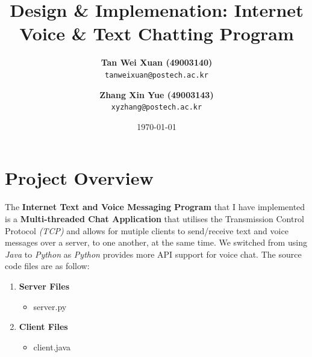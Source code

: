 \documentclass[a4paper,11pt]{article}
\begin{document}
\title{\vspace{-1.0cm}\textbf{Design \& Implemenation: \linebreak Internet Voice \& Text Chatting Program}}
\author{
  \textbf{Tan Wei Xuan (49003140)}\\
  \texttt{tanweixuan@postech.ac.kr}
  \and
   \textbf{Zhang Xin Yue (49003143)}\\
  \texttt{xyzhang@postech.ac.kr}
}
\date{\today}
\maketitle

\section{Project Overview}
The\textbf{ Internet Text and Voice Messaging Program} that I have implemented is a \textbf{Multi-threaded Chat Application} that utilises the Transmission Control Protocol \textit{(TCP)} and allows for mutiple clients to send/receive text and voice messages over a server, to one another, at the same time.  We switched from using \textit{Java} to \textit{Python} as \textit{Python} provides more API support for voice chat. The source code files are as follow:
\begin{enumerate}
	\item \textbf{Server Files}
\begin{itemize}
  	\item server.py
\end{itemize}
	\item \textbf{Client Files}
\begin{itemize}
  	\item client.java
\end{itemize}
\end{enumerate}
\end{document}
